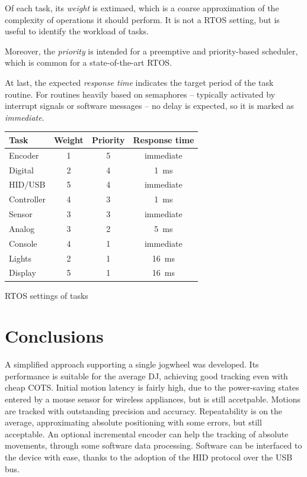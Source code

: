 \documentclass[a4paper,10pt]{article}
\makeatletter
\newenvironment{tablehere}{\def\@captype{table}\vspace{2ex}}{\vspace{2ex}}
\makeatother
\begin{document}
\begin{multicols}{2}
Of each task, its \emph{weight} is extimaed, which is a coarse approximation
of the complexity of operations it should perform. It is not a RTOS setting,
but is useful to identify the workload of tasks.

Moreover, the \emph{priority} is intended for a preemptive and priority-based
scheduler, which is common for a state-of-the-art RTOS.

At last, the expected \emph{response time} indicates the target period of the
task routine. For routines heavily based on semaphores -- typically activated
by interrupt signals or software messages -- no delay is expected, so it is
marked as \emph{immediate}.

\begin{tablehere}
\centering \footnotesize
\begin{tabular}{|l|c|c|c|}
\hline
\textbf{Task} & \textbf{Weight} & \textbf{Priority} & \textbf{Response time}	\\
\hline
Encoder		& 1	& 5	& immediate	\\
Digital		& 2	& 4	& 1~ms		\\
HID/USB		& 5	& 4	& immediate	\\
Controller	& 4	& 3	& 1~ms		\\
Sensor		& 3	& 3	& immediate	\\
Analog		& 3	& 2	& 5~ms		\\
Console		& 4	& 1	& immediate	\\
Lights		& 2	& 1	& 16~ms		\\
Display		& 5	& 1	& 16~ms		\\
\hline
\end{tabular}
\caption{RTOS settings of tasks}
\label{tab:fw_adv_tasks}
\end{tablehere}


\section{Conclusions}
\label{sec:conclusions}

A simplified approach supporting a single jogwheel was developed. Its
performance is suitable for the average DJ, achieving good tracking even with
cheap COTS. Initial motion latency is fairly high, due to the power-saving
states entered by a mouse sensor for wireless appliances, but is still
accetpable. Motions are tracked with outstanding precision and accuracy.
Repeatability is on the average, approximating absolute positioning with some
errors, but still acceptable. An optional incremental encoder can help the
tracking of absolute movements, through some software data processing.
Software can be interfaced to the device with ease, thanks to the adoption of
the HID protocol over the USB bus.


\end{multicols}
\end{document}
